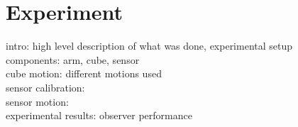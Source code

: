 \chapter{Experiment}
intro: high level description of what was done, experimental setup\\
components: arm, cube, sensor\\
cube motion: different motions used\\
sensor calibration:\\
sensor motion:\\
experimental results: observer performance\\

